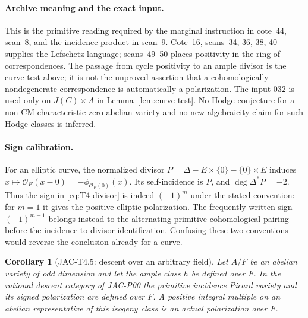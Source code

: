 \documentclass[11pt,a4paper]{article}
\newtheorem{corollary}[theorem]{Corollary}
\begin{document}
\paragraph{Archive meaning and the exact input.}
This is the primitive reading required by the marginal instruction in
cote~44, scan~8, and the incidence product in scan~9. Cote~16,
scans~34, 36, 38, 40 supplies the Lefschetz language; scans~49--50 places
positivity in the ring of correspondences. The passage from cycle
positivity to an ample divisor is the curve test above; it is not the
unproved assertion that a cohomologically nondegenerate correspondence
is automatically a polarization. The input 032 is used only on
$J(C)\times A$ in Lemma~\ref{lem:curve-test}. No Hodge conjecture for a
non-CM characteristic-zero abelian variety and no new algebraicity
claim for such Hodge classes is inferred.

\paragraph{Sign calibration.}
For an elliptic curve, the normalized divisor
$P=\Delta-E\times\{0\}-\{0\}\times E$ induces
$x\mapsto\mathcal O_E(x-0)=-\phi_{\mathcal O_E(0)}(x)$.
Its self-incidence is $P$, and $\deg\Delta^*P=-2$.
Thus the sign in \eqref{eq:T4-divisor} is indeed $(-1)^m$ under the
stated convention: for $m=1$ it gives the positive elliptic
polarization. The frequently written sign $(-1)^{m-1}$ belongs instead
to the alternating primitive cohomological pairing before the
incidence-to-divisor identification. Confusing these two conventions
would reverse the conclusion already for a curve.

\begin{corollary}[JAC-T4.5: descent over an arbitrary field]
Let $A/F$ be an abelian variety of odd dimension and let the ample
class $h$ be defined over $F$. In the rational descent category of
JAC-P00 the primitive incidence Picard variety and its signed
polarization are defined over $F$. A positive integral multiple on an
abelian representative of this isogeny class is an actual polarization
over $F$.
\end{corollary}
\end{document}
